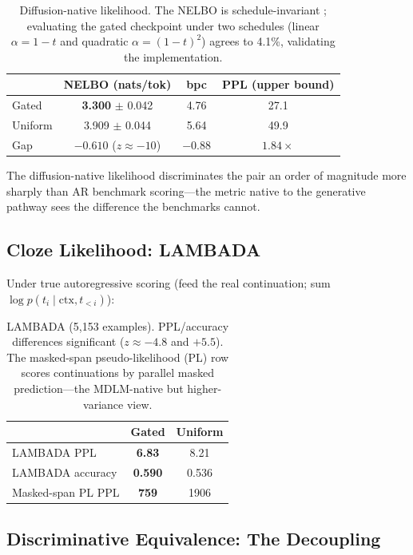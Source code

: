 \documentclass{article}
\begin{document}
\begin{table}[h]
\centering
\begin{tabular}{lccc}
\toprule
 & NELBO (nats/tok) & bpc & PPL (upper bound) \\
\midrule
Gated & \textbf{3.300} $\pm$ 0.042 & 4.76 & 27.1 \\
Uniform & 3.909 $\pm$ 0.044 & 5.64 & 49.9 \\
\midrule
Gap & $-0.610$ ($z \approx -10$) & $-0.88$ & $1.84\times$ \\
\bottomrule
\end{tabular}
\caption{Diffusion-native likelihood. The NELBO is schedule-invariant
\cite{sahoo2024mdlm}; evaluating the gated checkpoint under two schedules (linear
$\alpha = 1-t$ and quadratic $\alpha = (1-t)^2$) agrees to 4.1\%, validating the
implementation.}
\label{tab:elbo}
\end{table}

The diffusion-native likelihood discriminates the pair an order of magnitude more
sharply than AR benchmark scoring---the metric native to the generative pathway
sees the difference the benchmarks cannot.

\subsection{Cloze Likelihood: LAMBADA}
\label{sec:lambada}

Under true autoregressive scoring (feed the real continuation; sum
$\log p(t_i \mid \text{ctx}, t_{<i})$):

\begin{table}[h]
\centering
\begin{tabular}{lcc}
\toprule
 & Gated & Uniform \\
\midrule
LAMBADA PPL & \textbf{6.83} & 8.21 \\
LAMBADA accuracy & \textbf{0.590} & 0.536 \\
Masked-span PL PPL & \textbf{759} & 1906 \\
\bottomrule
\end{tabular}
\caption{LAMBADA (5{,}153 examples). PPL/accuracy differences significant
($z \approx -4.8$ and $+5.5$). The masked-span pseudo-likelihood (PL) row scores
continuations by parallel masked prediction---the MDLM-native but higher-variance
view.}
\label{tab:lambada}
\end{table}

\subsection{Discriminative Equivalence: The Decoupling}
\label{sec:decoupling}
\end{document}
